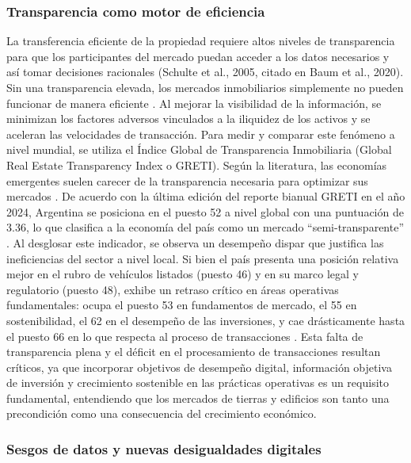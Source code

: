 \subsubsection{Transparencia como motor de eficiencia}

La transferencia eficiente de la propiedad requiere altos niveles de transparencia para que los participantes del mercado puedan acceder a los datos necesarios y así tomar decisiones racionales (Schulte et al., 2005, citado en Baum et al., 2020). Sin una transparencia elevada, los mercados inmobiliarios simplemente no pueden funcionar de manera eficiente \parencite{SiniakEtAl2020}. Al mejorar la visibilidad de la información, se minimizan los factores adversos vinculados a la iliquidez de los activos y se aceleran las velocidades de transacción. Para medir y comparar este fenómeno a nivel mundial, se utiliza el Índice Global de Transparencia Inmobiliaria (Global Real Estate Transparency Index o GRETI). Según la literatura, las economías emergentes suelen carecer de la transparencia necesaria para optimizar sus mercados \parencite{SiniakEtAl2020}. De acuerdo con la última edición del reporte bianual GRETI en el año 2024, Argentina se posiciona en el puesto 52 a nivel global con una puntuación de 3.36, lo que clasifica a la economía del país como un mercado ``semi-transparente'' \parencite{JLL2024}. Al desglosar este indicador, se observa un desempeño dispar que justifica las ineficiencias del sector a nivel local. Si bien el país presenta una posición relativa mejor en el rubro de vehículos listados (puesto 46) y en su marco legal y regulatorio (puesto 48), exhibe un retraso crítico en áreas operativas fundamentales: ocupa el puesto 53 en fundamentos de mercado, el 55 en sostenibilidad, el 62 en el desempeño de las inversiones, y cae drásticamente hasta el puesto 66 en lo que respecta al proceso de transacciones \parencite{JLL2024}. Esta falta de transparencia plena y el déficit en el procesamiento de transacciones resultan críticos, ya que incorporar objetivos de desempeño digital, información objetiva de inversión y crecimiento sostenible en las prácticas operativas es un requisito fundamental, entendiendo que los mercados de tierras y edificios son tanto una precondición como una consecuencia del crecimiento económico.

\subsubsection{Sesgos de datos y nuevas desigualdades digitales}

